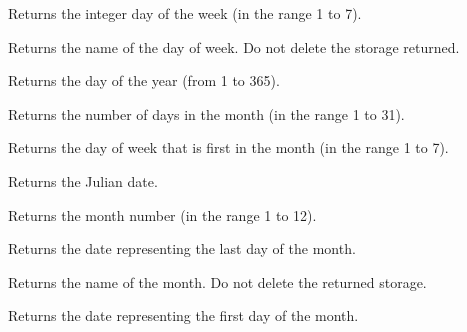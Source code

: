 Returns the integer day of the week (in the range 1 to 7).



Returns the name of the day of week. Do not delete the storage returned.


 

Returns the day of the year (from 1 to 365).


 

Returns the number of days in the month (in the range 1 to 31).


 

Returns the day of week that is first in the month (in the range 1 to 7).


 

Returns the Julian date.


 

Returns the month number (in the range 1 to 12).



Returns the date representing the last day of the month.



Returns the name of the month. Do not delete the returned storage.



Returns the date representing the first day of the month.



